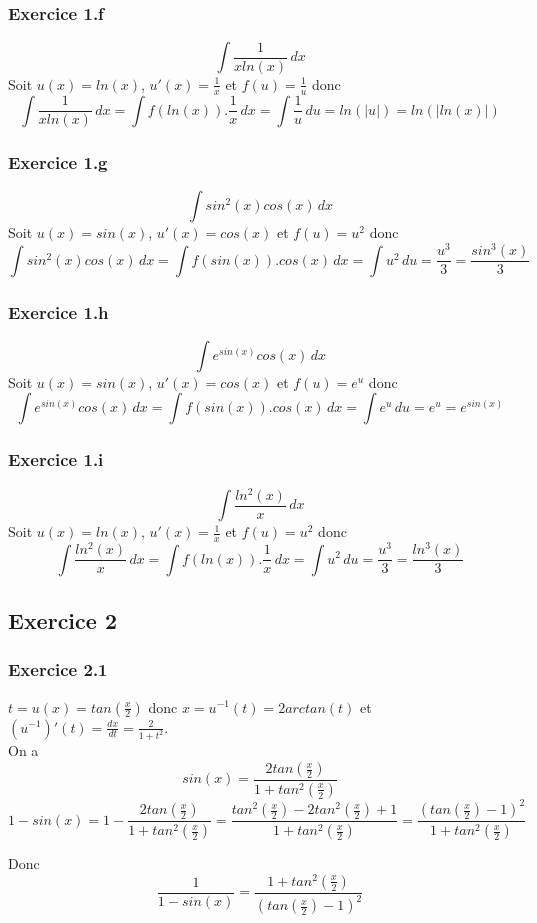\documentclass[]{book}
\theoremstyle{definition}
\begin{document}
\subsubsection*{Exercice 1.f}
$$\int{\frac{1}{xln(x)}\,dx}$$
Soit $u(x)=ln(x)$, $u'(x)=\frac{1}{x}$ et $f(u) = \frac{1}{u}$ donc
$$\int{\frac{1}{xln(x)}\,dx} = \int{f(ln(x)).\frac{1}{x}\,dx} = \int{\frac{1}{u}\,du} = ln(|u|) = ln(|ln(x)|)$$

\subsubsection*{Exercice 1.g}
$$\int{sin^2(x)cos(x)\,dx}$$
Soit $u(x)=sin(x)$, $u'(x)=cos(x)$ et $f(u)=u^2$ donc
$$\int{sin^2(x)cos(x)\,dx} = \int{f(sin(x)).cos(x)\,dx} = \int{u^2\,du} = \frac{u^3}{3} = \frac{sin^3(x)}{3}$$

\subsubsection*{Exercice 1.h}
$$\int{e^{sin(x)}cos(x)\,dx}$$
Soit $u(x)=sin(x)$, $u'(x)=cos(x)$ et $f(u)=e^u$ donc
$$\int{e^{sin(x)}cos(x)\,dx} = \int{f(sin(x)).cos(x)\,dx} = \int{e^u\,du} = e^u = e^{sin(x)}$$
 

\subsubsection*{Exercice 1.i}
$$\int{\frac{ln^2(x)}{x}\,dx}$$
Soit $u(x) = ln(x)$, $u'(x)=\frac{1}{x}$ et $f(u)=u^2$ donc
$$\int{\frac{ln^2(x)}{x}\,dx} = \int{f(ln(x)).\frac{1}{x}\,dx} = \int{u^2\,du} = \frac{u^3}{3} = \frac{ln^3(x)}{3}$$


\subsection*{Exercice 2}
\subsubsection*{Exercice 2.1}
$t = u(x) = tan(\frac{x}{2})$ donc $x = u^{-1}(t) = 2arctan(t)$ et $(u^{-1})'(t) = \frac{dx}{dt} = \frac{2}{1+t^2}$.\\
On a 
$$sin(x)=\frac{2tan(\frac{x}{2})}{1+tan^2(\frac{x}{2})}$$ 
$$1-sin(x) = 1 - \frac{2tan(\frac{x}{2})}{1+tan^2(\frac{x}{2})}
= \frac{tan^2(\frac{x}{2})-2tan^2(\frac{x}{2})+1}{1+tan^2(\frac{x}{2})} = \frac{(tan(\frac{x}{2})-1)^2}{1+tan^2(\frac{x}{2})}$$

Donc 
$$\frac{1}{1-sin(x)} = \frac{1+tan^2(\frac{x}{2})}{(tan(\frac{x}{2})-1)^2}$$
\end{document}
